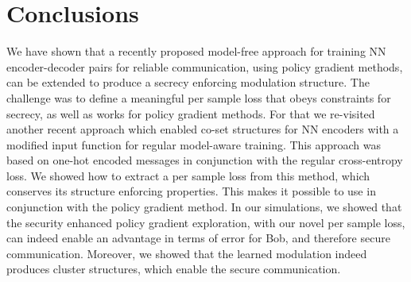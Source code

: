 \documentclass[conference, 10pt]{IEEEtran}
\begin{document}
\section{Conclusions}
We have shown that a recently proposed model-free approach for training NN encoder-decoder pairs for reliable communication, using policy gradient methods, can be extended to produce a secrecy enforcing modulation structure. The challenge was to define a meaningful per sample loss that obeys constraints for secrecy, as well as works for policy gradient methods. For that we re-visited another recent approach which enabled co-set structures for NN encoders with a modified input function for regular model-aware training. This approach was based on one-hot encoded messages in conjunction with the regular cross-entropy loss.  We showed how to extract a per sample loss from this method, which conserves its structure enforcing properties. This makes it possible to use in conjunction with the policy gradient method. In our simulations, we showed that the security enhanced policy gradient exploration, with our novel per sample loss, can indeed enable an advantage in terms of error for Bob, and therefore secure communication.
Moreover, we showed that the learned modulation indeed produces cluster structures, which enable the secure communication.
\label{sec:conclusions}




\end{document}
